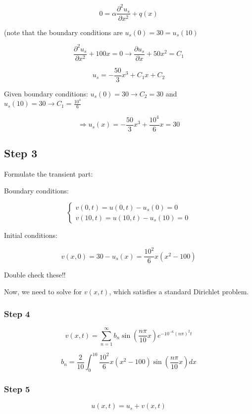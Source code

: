 $$0 = \alpha \frac{\partial^2 u_s}{\partial x^2} + q(x)$$

(note that the boundary conditions are $u_s(0) = 30 = u_s(10)$

$$\frac{\partial^2 u_s}{\partial x^2} + 100x = 0 \longrightarrow \frac{\partial u_s}{\partial x} + 50 x^2 = C_1$$

$$u_s = - \frac{50}{3} x^3 + C_1 x + C_2$$

Given boundary conditions: $u_s(0) = 30 \longrightarrow C_2 = 30$ and $u_s(10) = 30 \longrightarrow C_1 = \frac{10^4}{6}$

$$\Rightarrow u_s(x) = - \frac{50}{3} x^3 + \frac{10^4}{6} x = 30$$

\subsection{Step 3}

Formulate the transient part:

Boundary conditions:

$$\left\{ \begin{matrix} v(0,t) = u(0,t) - u_s(0) = 0 \\ v(10,t) = u(10,t) - u_s(10) = 0 \end{matrix} \right.$$

Initial conditions:

$$v(x,0) = 30 - u_s (x) = \frac{10^2}{6} x (x^2 - 100)$$

Double check these!!

Now, we need to solve for $v(x,t)$, which satisfies a standard Dirichlet problem. 

\subsubsection{Step 4}

$$v(x,t) = \sum_{n = 1}^\infty b_n \sin \left( \frac{n \pi}{10} x \right) e^{- 10^{-6} (n \pi)^2 t}$$

$$b_n = \frac{2}{10} \int_0^{10} \frac{10^2}{6} x (x^2 - 100) \sin( \frac{n \pi}{10} x) dx$$

\subsubsection{Step 5}

$$u(x,t) = u_s + v(x,t)$$
